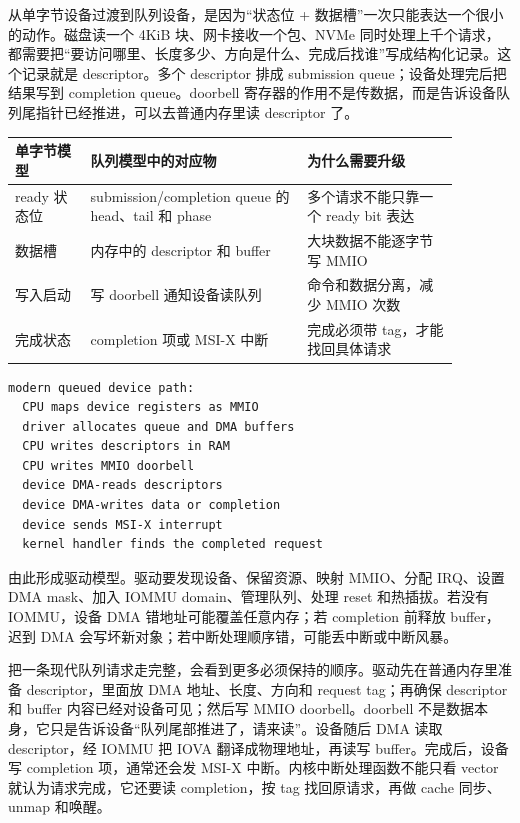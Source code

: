 从单字节设备过渡到队列设备，是因为“状态位 + 数据槽”一次只能表达一个很小的动作。磁盘读一个 4KiB 块、网卡接收一个包、NVMe 同时处理上千个请求，都需要把“要访问哪里、长度多少、方向是什么、完成后找谁”写成结构化记录。这个记录就是 descriptor。多个 descriptor 排成 submission queue；设备处理完后把结果写到 completion queue。doorbell 寄存器的作用不是传数据，而是告诉设备队列尾指针已经推进，可以去普通内存里读 descriptor 了。

\begin{longtable}{p{0.15\linewidth}p{0.43\linewidth}p{0.3\linewidth}}
\toprule
单字节模型 & 队列模型中的对应物 & 为什么需要升级 \\
\midrule
ready 状态位 & submission/completion queue 的 head、tail 和 phase & 多个请求不能只靠一个 ready bit 表达 \\
数据槽 & 内存中的 descriptor 和 buffer & 大块数据不能逐字节写 MMIO \\
写入启动 & 写 doorbell 通知设备读队列 & 命令和数据分离，减少 MMIO 次数 \\
完成状态 & completion 项或 MSI-X 中断 & 完成必须带 tag，才能找回具体请求 \\
\bottomrule
\end{longtable}

\begin{lstlisting}
modern queued device path:
  CPU maps device registers as MMIO
  driver allocates queue and DMA buffers
  CPU writes descriptors in RAM
  CPU writes MMIO doorbell
  device DMA-reads descriptors
  device DMA-writes data or completion
  device sends MSI-X interrupt
  kernel handler finds the completed request
\end{lstlisting}

由此形成驱动模型。驱动要发现设备、保留资源、映射 MMIO、分配 IRQ、设置 DMA mask、加入 IOMMU domain、管理队列、处理 reset 和热插拔。若没有 IOMMU，设备 DMA 错地址可能覆盖任意内存；若 completion 前释放 buffer，迟到 DMA 会写坏新对象；若中断处理顺序错，可能丢中断或中断风暴。

把一条现代队列请求走完整，会看到更多必须保持的顺序。驱动先在普通内存里准备 descriptor，里面放 DMA 地址、长度、方向和 request tag；再确保 descriptor 和 buffer 内容已经对设备可见；然后写 MMIO doorbell。doorbell 不是数据本身，它只是告诉设备“队列尾部推进了，请来读”。设备随后 DMA 读取 descriptor，经 IOMMU 把 IOVA 翻译成物理地址，再读写 buffer。完成后，设备写 completion 项，通常还会发 MSI-X 中断。内核中断处理函数不能只看 vector 就认为请求完成，它还要读 completion，按 tag 找回原请求，再做 cache 同步、unmap 和唤醒。

